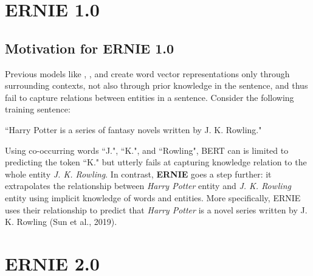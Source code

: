 \section{ERNIE 1.0} \label{sec:ERNIE_1}

\subsection{Motivation for ERNIE 1.0}

Previous models like , , and  create word vector representations only through surrounding contexts, not also through prior knowledge in the sentence, and thus fail to capture relations between entities in a sentence. Consider the following training sentence: 

``Harry Potter is a series of fantasy novels written by J. K. Rowling."

Using co-occurring words ``J.", ``K.", and ``Rowling", BERT can is limited to predicting the token ``K." but utterly fails at capturing knowledge relation to the whole entity \emph{J. K. Rowling}. In contrast, \textbf{ERNIE} goes a step further: it extrapolates the relationship between \emph{Harry Potter} entity and \emph{J. K. Rowling} entity using implicit knowledge of words and entities. More specifically, ERNIE uses their relationship to predict that \emph{Harry Potter} is a novel series written by J. K. Rowling (Sun et al., 2019). 




\section{ERNIE 2.0} \label{sec:ERNIE_2}